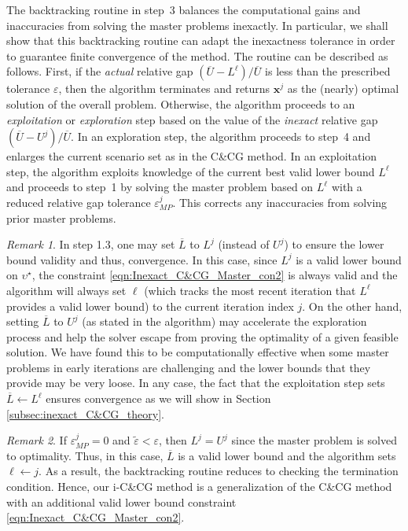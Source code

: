 \documentclass[preprint,review,11pt]{elsarticle}
\theoremstyle{definition}
\theoremstyle{remark}
\newtheorem{rem}{Remark}
\newcommand{\epst}{\widetilde{\varepsilon}}
\newcommand{\xb}{\pmb{x}}
\newcommand{\Lbar}{\overline{L}}
\newcommand{\Ubar}{\overline{U}}
\newcommand{\tim}[1]{\textcolor{black}{#1}}
\begin{document}
The backtracking routine in step~3 balances the computational gains and inaccuracies from solving the master problems inexactly.  In particular, we shall show that this backtracking routine can adapt the inexactness tolerance in order to guarantee finite convergence of the method.  The routine can be described as follows.  First, if the \textit{actual} relative gap $(\Ubar-L^\ell)/\Ubar$ is less than the prescribed tolerance $\varepsilon$, then the algorithm terminates and returns $\xb^j$ as the (nearly) optimal solution of the overall problem.  Otherwise, the algorithm proceeds to an \textit{exploitation} or \textit{exploration} step based on the value of the \textit{inexact} relative gap $(\Ubar-U^j)/\Ubar$.  In an exploration step, the algorithm proceeds to step~4 and enlarges the current scenario set as in the C\&CG method.  In an exploitation step, the algorithm exploits knowledge of the current best valid lower bound $L^\ell$ and proceeds to step~1 by solving the master problem based on $L^\ell$ with a reduced relative gap tolerance $\varepsilon_{MP}^j$.  This corrects any inaccuracies from solving prior master problems.

\begin{rem}\label{rem:lower_bound}
In step 1.3, one may set $\Lbar$ to $L^j$ (instead of $U^j$) to ensure the lower bound validity and thus, convergence. In this case, since $L^j$ is a valid lower bound on $\upsilon^\star$, the constraint \eqref{eqn:Inexact_C&CG_Master_con2} is always valid and the algorithm will always set $\ell$ (which tracks the most recent iteration that $L^\ell$ provides a valid lower bound) to the current iteration index $j$. On the other hand, setting $\Lbar$ to $U^j$ (as stated in the algorithm) may accelerate the exploration process and help the solver escape from proving the optimality of a given feasible solution. We have found this to be computationally effective when some master problems in early iterations are challenging and the lower bounds that they provide may be very loose.  In any case, the fact that the exploitation step sets $\Lbar \gets L^\ell$ ensures convergence as we will show in Section \ref{subsec:inexact_C&CG_theory}.
\end{rem}


\begin{rem}
If $\varepsilon_{MP}^j = 0$ and $\epst<\varepsilon$, then $L^j=U^j$ since the master problem is solved to optimality. Thus, in this case, $\Lbar$ is a valid lower bound and the algorithm sets $\ell \gets j$. As a result, the backtracking routine reduces to checking the termination condition.  Hence, our i-C\&CG method is a generalization of the C\&CG method with an additional valid lower bound constraint \eqref{eqn:Inexact_C&CG_Master_con2}.
\end{rem}
\end{document}
